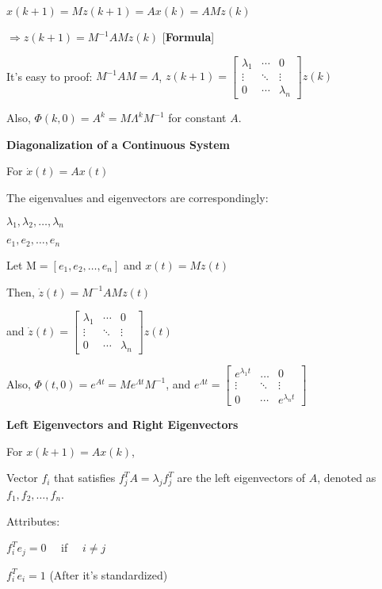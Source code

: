 \documentclass{article}
\newcommand{\bigtitle}[1]{
	\noindent
	\textbf{#1}
}
\begin{document}
\begin{spacing}{1.2}
$x(k+1)=M z(k+1)=Ax(k)=A M z(k)$

$
\Rightarrow
z(k+1)=M^{-1} A M z(k)
$ [\textbf{Formula}]

It's easy to proof: $M^{-1} A M=\Lambda$,
$z(k+1)=\left[ \begin{array}{ccc}{\lambda_{1}} & {\cdots} & {0} \\ {\vdots} & {\ddots} & {\vdots} \\ {0} & {\cdots} & {\lambda_{n}}\end{array}\right] z(k)$


Also, $\Phi(k,0) = A^{k}=M \Lambda^{k} M^{-1}$ for constant $A$.


\bigtitle{Diagonalization of a Continuous System}

For $\dot{x}(t)=A x(t)$

The eigenvalues and eigenvectors are correspondingly:

$\lambda_{1}, \lambda_{2}, \ldots, \lambda_{n}$

$e_{1}, e_{2}, \ldots, e_{n}$

Let $\mathrm{M}=\left[e_{1}, e_{2}, \ldots, e_{n}\right]$ and $x(t)=M z(t)$

Then, $\dot{z}(t)=M^{-1} A M z(t)$

and $\dot{z}(t)=\left[ \begin{array}{ccc}{\lambda_{1}} & {\cdots} & {0} \\ {\vdots} & {\ddots} & {\vdots} \\ {0} & {\cdots} & {\lambda_{n}}\end{array}\right] z(t)$

Also, $\Phi(t,0) = e^{A t} =M e^{\Lambda t} M^{-1}$, and $e^{\Lambda t}=\left[ \begin{array}{ccc}{e^{\lambda_{1} t}} & {\dots} & {0} \\ {\vdots} & {\ddots} & {\vdots} \\ {0} & {\cdots} & {e^{\lambda_{n} t}}\end{array}\right]$



\bigtitle{Left Eigenvectors and Right Eigenvectors}

For $x(k+1)=A x(k)$,

Vector $f_i$ that satisfies $f_{j}^{T} A=\lambda_{j} f_{j}^{T}$ are the left eigenvectors of $A$, denoted as $f_{1}, f_{2}, \ldots, f_{n}$.

Attributes: 

$f_{i}^{T} e_{j}=0 \quad$ if $\quad i \neq j$

$f_{i}^{T} e_{i}=1$ (After it's standardized)


\end{spacing}
\end{document}
